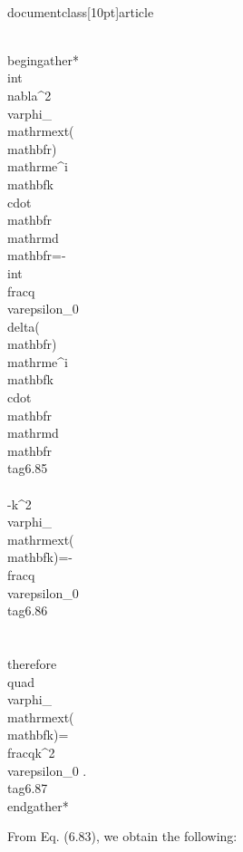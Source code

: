 \\documentclass[10pt]{article}
\begin{document}
{{{{\\begin{gather*}
\\int \\nabla^{2} \\varphi_{\\mathrm{ext}}(\\mathbf{r}) \\mathrm{e}^{i \\mathbf{k} \\cdot \\mathbf{r}} \\mathrm{d} \\mathbf{r}=-\\int \\frac{q}{\\varepsilon_{0}} \\delta(\\mathbf{r}) \\mathrm{e}^{i \\mathbf{k} \\cdot \\mathbf{r}} \\mathrm{d} \\mathbf{r}  \\tag{6.85}\\\\
-k^{2} \\varphi_{\\mathrm{ext}}(\\mathbf{k})=-\\frac{q}{\\varepsilon_{0}}  \\tag{6.86}\\\\
\\therefore \\quad \\varphi_{\\mathrm{ext}}(\\mathbf{k})=\\frac{q}{k^{2} \\varepsilon_{0}} . \\tag{6.87}
\\end{gather*}


From Eq. (6.83), we obtain the following:


}}}}
\end{document}
